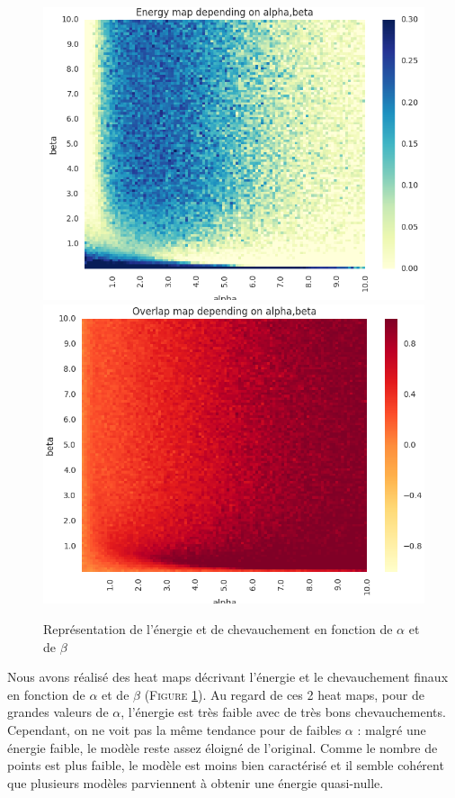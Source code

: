 \documentclass[twocolumn]{article}
\begin{document}
		\begin{figure}
			\includegraphics[width=\columnwidth]{../tobekept/ex2_2323132067031870085-r.png}
			\includegraphics[width=\columnwidth]{../tobekept/ex3_2323132067031870085-r.png}
			\caption{\label{ex2}Représentation de l'énergie et de chevauchement en fonction de $\alpha$ et de $\beta$}
		\end{figure}
		Nous avons réalisé des heat maps décrivant l'énergie et le chevauchement finaux en fonction de $\alpha$ et de $\beta$ (\textsc{Figure} \ref{ex2}). Au regard de ces 2 heat maps, pour de grandes valeurs de $\alpha$, l'énergie est très faible avec de très bons chevauchements. Cependant, on ne voit pas la même tendance pour de faibles $\alpha$ : malgré une énergie faible, le modèle reste assez éloigné de l'original. Comme le nombre de points est plus faible, le modèle est moins bien caractérisé et il semble cohérent que plusieurs modèles parviennent à obtenir une énergie quasi-nulle. 
\end{document}
